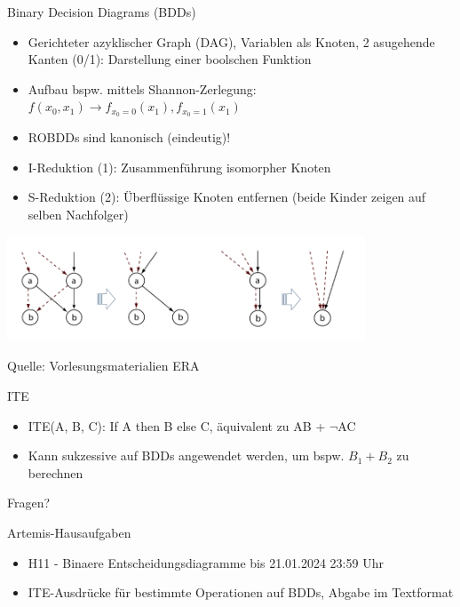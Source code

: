 \documentclass[
  german,            %
  aspectratio=169,    %
]{tumbeamer}
\begin{document}
\begin{frame}[c, fragile]{Binary Decision Diagrams (BDDs)}{}
  \begin{itemize}
    \item Gerichteter azyklischer Graph (DAG), Variablen als Knoten, 2 asugehende Kanten (0/1): Darstellung einer boolschen Funktion
    \item Aufbau bspw. mittels Shannon-Zerlegung: $f(x_0, x_1) \rightarrow f_{x_0=0}(x_1), f_{x_0=1}(x_1)$
    \item ROBDDs sind kanonisch (eindeutig)!
    \item I-Reduktion (1): Zusammenführung isomorpher Knoten
    \item S-Reduktion (2): \glqq Überflüssige\grqq\; Knoten entfernen (beide Kinder zeigen auf selben Nachfolger)
  \end{itemize}
  \begin{center}
    \includegraphics[width=0.8\textwidth]{w11_bdd_reduction.png}
  \end{center}
  \centering
  \tiny{Quelle: Vorlesungsmaterialien ERA}
\end{frame}

\begin{frame}[c, fragile]{ITE}
  \begin{itemize}
    \item ITE(A, B, C): If A then B else C, äquivalent zu AB + $\neg$AC
    \item Kann sukzessive auf BDDs angewendet werden, um bspw. $B_1 + B_2$ zu berechnen
  \end{itemize}
\end{frame}


\begin{frame}[c]{}{}
  \begin{center}
    \LARGE Fragen?
  \end{center}
\end{frame}

\begin{frame}[c, fragile]{Artemis-Hausaufgaben}{}
  \begin{itemize}
    \item H11 - Binaere Entscheidungsdiagramme bis 21.01.2024 23:59 Uhr
    \item ITE-Ausdrücke für bestimmte Operationen auf BDDs, Abgabe im Textformat
  \end{itemize}
\end{frame}
\end{document}
